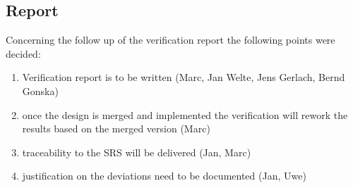 \documentclass{article}
\begin{document}
\subsection{Report}

Concerning the follow up of the verification report the following points were decided:
\begin{enumerate} 
\item Verification report is to be written (Marc, Jan Welte, Jens Gerlach, Bernd Gonska)
\item once the design is merged and implemented the verification will rework the results based on the merged version (Marc)
\item traceability to the SRS will be delivered (Jan, Marc)
\item justification on the deviations need to be documented (Jan, Uwe)
\end{enumerate}
               


\end{document}
